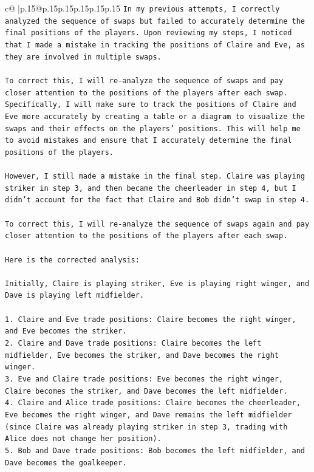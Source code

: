 \documentclass{article}
\begin{document}
{\begin{supertabular}{c@{$\;$}|p{.15\linewidth}@{}p{.15\linewidth}p{.15\linewidth}p{.15\linewidth}p{.15\linewidth}p{.15\linewidth}}
{{{\texttt{In my previous attempts, I correctly analyzed the sequence of swaps but failed to accurately determine the final positions of the players. Upon reviewing my steps, I noticed that I made a mistake in tracking the positions of Claire and Eve, as they are involved in multiple swaps. } \\
\\ 
\texttt{To correct this, I will re{-}analyze the sequence of swaps and pay closer attention to the positions of the players after each swap. Specifically, I will make sure to track the positions of Claire and Eve more accurately by creating a table or a diagram to visualize the swaps and their effects on the players' positions. This will help me to avoid mistakes and ensure that I accurately determine the final positions of the players. } \\
\\ 
\texttt{However, I still made a mistake in the final step. Claire was playing striker in step 3, and then became the cheerleader in step 4, but I didn't account for the fact that Claire and Bob didn't swap in step 4. } \\
\\ 
\texttt{To correct this, I will re{-}analyze the sequence of swaps again and pay closer attention to the positions of the players after each swap. } \\
\\ 
\texttt{Here is the corrected analysis:} \\
\\ 
\texttt{Initially, Claire is playing striker, Eve is playing right winger, and Dave is playing left midfielder.} \\
\\ 
\texttt{1. Claire and Eve trade positions: Claire becomes the right winger, and Eve becomes the striker.} \\
\texttt{2. Claire and Dave trade positions: Claire becomes the left midfielder, Eve becomes the striker, and Dave becomes the right winger.} \\
\texttt{3. Eve and Claire trade positions: Eve becomes the right winger, Claire becomes the striker, and Dave becomes the left midfielder.} \\
\texttt{4. Claire and Alice trade positions: Claire becomes the cheerleader, Eve becomes the right winger, and Dave remains the left midfielder (since Claire was already playing striker in step 3, trading with Alice does not change her position).} \\
\texttt{5. Bob and Dave trade positions: Bob becomes the left midfielder, and Dave becomes the goalkeeper.} \\
}}}
\end{supertabular}}
\end{document}
